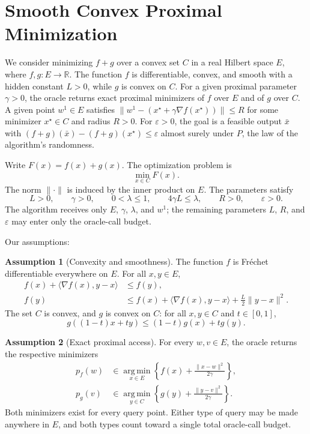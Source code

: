 \documentclass[10pt]{article}
\theoremstyle{definition}
\newtheorem{assumption}{Assumption}
\begin{document}
\section*{Smooth Convex Proximal Minimization}
We consider minimizing $f+g$ over a convex set $C$ in a real Hilbert space $E$, where $f,g:E\to\mathbb{R}$. The function $f$ is differentiable, convex, and smooth with a hidden constant $L>0$, while $g$ is convex on $C$. For a given proximal parameter $\gamma>0$, the oracle returns exact proximal minimizers of $f$ over $E$ and of $g$ over $C$. A given point $w^1\in E$ satisfies $\|w^1-(x^\star+\gamma\nabla f(x^\star))\|\leq R$ for some minimizer $x^\star\in C$ and radius $R>0$. For $\varepsilon>0$, the goal is a feasible output $\bar{x}$ with $(f+g)(\bar{x})-(f+g)(x^\star)\leq\varepsilon$ almost surely under $P$, the law of the algorithm's randomness.

Write $F(x)=f(x)+g(x)$. The optimization problem is
\[
\min_{x\in C} F(x).
\]
The norm $\|\cdot\|$ is induced by the inner product on $E$. The parameters satisfy
\[
L>0,\qquad \gamma>0,\qquad 0<\lambda\leq 1,
\qquad 4\gamma L\leq\lambda,\qquad R>0,\qquad \varepsilon>0.
\]
The algorithm receives only $E$, $\gamma$, $\lambda$, and $w^1$; the remaining parameters $L$, $R$, and $\varepsilon$ may enter only the oracle-call budget.

Our assumptions:
\begin{assumption}[Convexity and smoothness]
The function $f$ is Fr\'echet differentiable everywhere on $E$. For all $x,y\in E$,
\[
\begin{aligned}
f(x)+\langle\nabla f(x),y-x\rangle
&\leq f(y),\\
f(y)&\leq f(x)+\langle\nabla f(x),y-x\rangle
+\frac{L}{2}\|y-x\|^2.
\end{aligned}
\]
The set $C$ is convex, and $g$ is convex on $C$: for all $x,y\in C$ and $t\in[0,1]$,
\[
g((1-t)x+ty)\leq (1-t)g(x)+t g(y).
\]
\end{assumption}

\begin{assumption}[Exact proximal access]
For every $w,v\in E$, the oracle returns the respective minimizers
\[
\begin{aligned}
p_f(w)&\in\operatorname*{arg\,min}_{x\in E}
\left\{f(x)+\frac{\|x-w\|^2}{2\gamma}\right\},\\
p_g(v)&\in\operatorname*{arg\,min}_{y\in C}
\left\{g(y)+\frac{\|y-v\|^2}{2\gamma}\right\}.
\end{aligned}
\]
Both minimizers exist for every query point. Either type of query may be made anywhere in $E$, and both types count toward a single total oracle-call budget.
\end{assumption}
\end{document}
